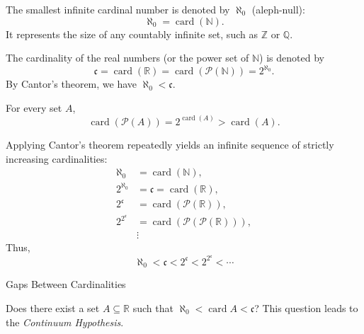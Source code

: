 \documentclass[12pt, a4paper]{article}
\DeclareMathOperator{\card}{card}
\newcommand{\N}{\mathbb{N}}
\newcommand{\R}{\mathbb{R}}
\newcommand{\Q}{\mathbb{Q}}
\newcommand{\Z}{\mathbb{Z}}
\begin{document}
\vspace{10pt}

\begin{definition}
	The smallest infinite cardinal number is denoted by $\aleph_0$ (aleph-null):
	\[
	\aleph_0 = \card(\N).
	\]
	It represents the size of any countably infinite set, such as $\Z$ or $\Q$.
\end{definition}

\vfill

\begin{definition}[Continuum]
	The cardinality of the real numbers (or the power set of $\N$) is denoted by
	\[
	\mathfrak{c} = \card(\R) = \card(\mathcal{P}(\N)) = 2^{\aleph_0}.
	\]
	By Cantor’s theorem, we have $\aleph_0 < \mathfrak{c}$.
\end{definition}
\vfill

\clearpage

\begin{theorem}
	For every set $A$,
	\[
	\card(\mathcal{P}(A)) = 2^{\card(A)} > \card(A).
	\]
\end{theorem}

\vspace{20pt}

\begin{definition}
	Applying Cantor’s theorem repeatedly yields an infinite sequence of strictly increasing cardinalities:
	\[
	\begin{aligned}
	\aleph_0 &= \card(\N),\\[4pt]
	2^{\aleph_0} &= \mathfrak{c} = \card(\R),\\[4pt]
	2^{\mathfrak{c}} &= \card(\mathcal{P}(\R)),\\[4pt]
	2^{2^{\mathfrak{c}}} &= \card(\mathcal{P}(\mathcal{P}(\R))),\\[4pt]
	&\vdots
	\end{aligned}
	\]
	Thus,
	\[
	\aleph_0 < \mathfrak{c} < 2^{\mathfrak{c}} < 2^{2^{\mathfrak{c}}} < \cdots
	\]
\end{definition}

\clearpage

\begin{heading}
	Gaps Between Cardinalities
\end{heading}

\vspace{10pt}

\begin{problem}
	Does there exist a set \( A \subseteq \R \) such that \( \aleph_0 < \card A < \mathfrak{c} \)? This question leads to the \emph{Continuum Hypothesis}.
\end{problem}
\end{document}
